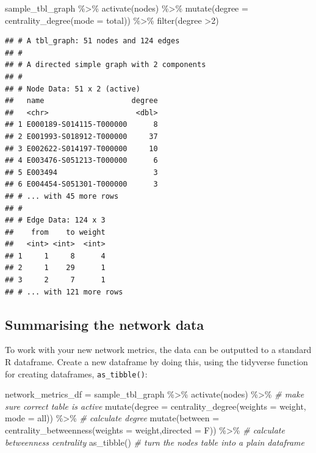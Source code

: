 \documentclass[
]{book}
\newenvironment{Shaded}{\begin{snugshade}}{\end{snugshade}}
\newcommand{\AttributeTok}[1]{\textcolor[rgb]{0.77,0.63,0.00}{#1}}
\newcommand{\CommentTok}[1]{\textcolor[rgb]{0.56,0.35,0.01}{\textit{#1}}}
\newcommand{\DecValTok}[1]{\textcolor[rgb]{0.00,0.00,0.81}{#1}}
\newcommand{\FunctionTok}[1]{\textcolor[rgb]{0.00,0.00,0.00}{#1}}
\newcommand{\NormalTok}[1]{#1}
\newcommand{\OtherTok}[1]{\textcolor[rgb]{0.56,0.35,0.01}{#1}}
\newcommand{\SpecialCharTok}[1]{\textcolor[rgb]{0.00,0.00,0.00}{#1}}
\newcommand{\StringTok}[1]{\textcolor[rgb]{0.31,0.60,0.02}{#1}}
\begin{document}
\begin{Shaded}
\begin{Highlighting}[]
\NormalTok{sample\_tbl\_graph }\SpecialCharTok{\%\textgreater{}\%} 
  \FunctionTok{activate}\NormalTok{(nodes) }\SpecialCharTok{\%\textgreater{}\%} 
  \FunctionTok{mutate}\NormalTok{(}\AttributeTok{degree =} \FunctionTok{centrality\_degree}\NormalTok{(}\AttributeTok{mode =} \StringTok{\textquotesingle{}total\textquotesingle{}}\NormalTok{)) }\SpecialCharTok{\%\textgreater{}\%} 
  \FunctionTok{filter}\NormalTok{(degree }\SpecialCharTok{\textgreater{}}\DecValTok{2}\NormalTok{)}
\end{Highlighting}
\end{Shaded}

\begin{verbatim}
## # A tbl_graph: 51 nodes and 124 edges
## #
## # A directed simple graph with 2 components
## #
## # Node Data: 51 x 2 (active)
##   name                    degree
##   <chr>                    <dbl>
## 1 E000189-S014115-T000000      8
## 2 E001993-S018912-T000000     37
## 3 E002622-S014197-T000000     10
## 4 E003476-S051213-T000000      6
## 5 E003494                      3
## 6 E004454-S051301-T000000      3
## # ... with 45 more rows
## #
## # Edge Data: 124 x 3
##    from    to weight
##   <int> <int>  <int>
## 1     1     8      4
## 2     1    29      1
## 3     2     7      1
## # ... with 121 more rows
\end{verbatim}

\hypertarget{summarising-the-network-data}{%
\subsection{Summarising the network data}\label{summarising-the-network-data}}

To work with your new network metrics, the data can be outputted to a standard R dataframe. Create a new dataframe by doing this, using the tidyverse function for creating dataframes, \texttt{as\_tibble()}:

\begin{Shaded}
\begin{Highlighting}[]
\NormalTok{network\_metrics\_df }\OtherTok{=}\NormalTok{ sample\_tbl\_graph }\SpecialCharTok{\%\textgreater{}\%} 
  \FunctionTok{activate}\NormalTok{(nodes) }\SpecialCharTok{\%\textgreater{}\%} \CommentTok{\# make sure correct table is active}
  \FunctionTok{mutate}\NormalTok{(}\AttributeTok{degree =} \FunctionTok{centrality\_degree}\NormalTok{(}\AttributeTok{weights =}\NormalTok{ weight, }\AttributeTok{mode =} \StringTok{\textquotesingle{}all\textquotesingle{}}\NormalTok{)) }\SpecialCharTok{\%\textgreater{}\%} \CommentTok{\# calculate degree}
  \FunctionTok{mutate}\NormalTok{(}\AttributeTok{between =} \FunctionTok{centrality\_betweenness}\NormalTok{(}\AttributeTok{weights =}\NormalTok{ weight,}\AttributeTok{directed =}\NormalTok{ F)) }\SpecialCharTok{\%\textgreater{}\%}  \CommentTok{\# calculate betweenness centrality}
  \FunctionTok{as\_tibble}\NormalTok{() }\CommentTok{\# turn the nodes table into a plain dataframe}
\end{Highlighting}
\end{Shaded}
\end{document}
